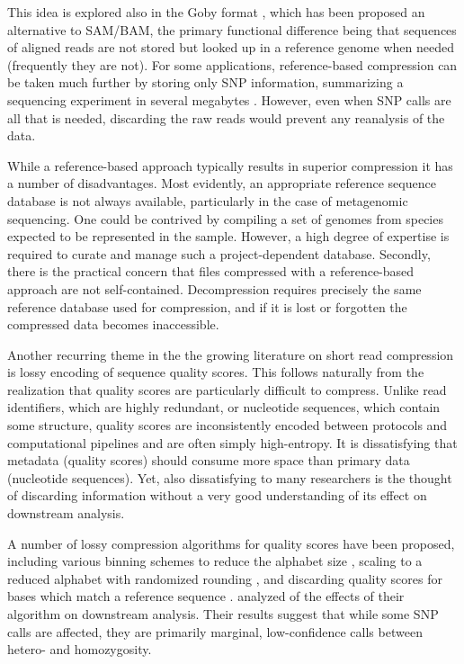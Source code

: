\documentclass[a4,center,fleqn]{NAR}
\begin{document}
This idea is explored also in the Goby format \citep{Goby2012}, which has been
proposed an alternative to SAM/BAM, the primary functional difference being
that sequences of aligned reads are not stored but looked up in a reference
genome when needed (frequently they are not). For some applications,
reference-based compression can be taken much further by storing only SNP
information, summarizing a sequencing experiment in several megabytes
\citep{Christley2009}. However, even when SNP calls are all that is needed,
discarding the raw reads would prevent any reanalysis of the data.

While a reference-based approach typically results in superior compression it
has a number of disadvantages. Most evidently, an appropriate reference
sequence database is not always available, particularly in the case of metagenomic
sequencing. One could be contrived by compiling a set of genomes from species
expected to be represented in the sample. However, a high degree of expertise
is required to curate and manage such a project-dependent database. Secondly,
there is the practical concern that files compressed with a reference-based
approach are not self-contained. Decompression requires precisely the same
reference database used for compression, and if it is lost or forgotten the
compressed data becomes inaccessible.



Another recurring theme in the the growing literature on short read
compression is lossy encoding of sequence quality scores. This follows
naturally from the realization that quality scores are particularly difficult
to compress. Unlike read identifiers, which are highly redundant, or
nucleotide sequences, which contain some structure, quality scores are
inconsistently encoded between protocols and computational pipelines and are
often simply high-entropy. It is dissatisfying that metadata (quality scores)
should consume more space than primary data (nucleotide sequences). Yet, also
dissatisfying to many researchers is the thought of discarding information
without a very good understanding of its effect on downstream analysis.

A number of lossy compression algorithms for quality scores have been
proposed, including various binning schemes to reduce the alphabet size
\citep{Wan2011, Hach2012}, scaling to a reduced alphabet with randomized
rounding \citep{Kozanitis2011}, and discarding quality scores for bases which
match a reference sequence \citep{Hsi-YangFritz2011}. \citet{Kozanitis2011}
analyzed of the effects of their algorithm on downstream analysis. Their
results suggest that while some SNP calls are affected, they are primarily
marginal, low-confidence calls between hetero- and homozygosity.
\end{document}
